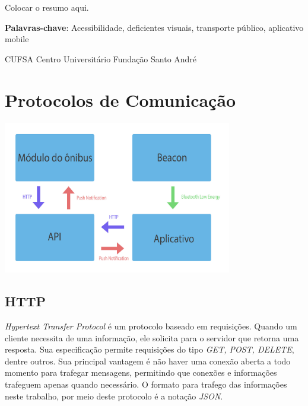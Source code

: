 \documentclass[
	12pt,				%
	oneside,			%
	a4paper,			%
	brazil				%
]{abntex2}
\begin{document}

\setlength{\absparsep}{18pt} %
\begin{resumo}
 
Colocar o resumo aqui.

 \textbf{Palavras-chave}: Acessibilidade, deficientes visuais, transporte público, aplicativo mobile
\end{resumo}


\begin{siglas} 
\item[CUFSA] Centro Universitário Fundação Santo André
\end{siglas}


\tableofcontents*
\cleardoublepage



\textual

\section{Protocolos de Comunicação}

\includegraphics[width=10cm, center]{images/diagram_protocols}

\subsection{HTTP}

\textit{Hypertext Transfer Protocol} é um protocolo baseado em requisições. Quando um cliente necessita de uma informação, ele solicita para o servidor que retorna uma resposta. Sua especificação permite requisições do tipo \textit{GET, POST, DELETE}, dentre outros. Sua principal vantagem é não haver uma conexão aberta a todo momento para trafegar mensagens, permitindo que conexões e informações trafeguem apenas quando necessário. O formato para trafego das informações neste trabalho, por meio deste protocolo é a notação \textit{JSON}.
\end{document}
